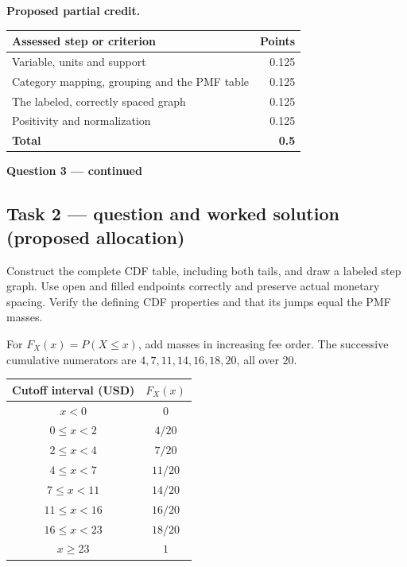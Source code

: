 \par\smallskip
\noindent\begin{minipage}{\linewidth}
\textbf{Proposed partial credit.}\par\smallskip
\begin{tabularx}{\linewidth}{@{}>{\raggedright\arraybackslash}X r@{}}\toprule
\textbf{Assessed step or criterion} & \textbf{Points}\\\midrule
Variable, units and support & 0.125\\
Category mapping, grouping and the PMF table & 0.125\\
The labeled, correctly spaced graph & 0.125\\
Positivity and normalization & 0.125\\
\midrule
\textbf{Total} & \textbf{0.5}\\
\bottomrule\end{tabularx}
\end{minipage}\par\smallskip

\par\vspace{3mm}\secInicio[][sec:q3]

\clearpage
\textbf{Question 3 --- continued}

\subsection*{Task 2 --- question and worked solution (proposed allocation) }
\label{sol:q3t2}

Construct the complete CDF table, including both tails, and draw a labeled step graph. Use open and filled endpoints correctly and preserve actual monetary spacing. Verify the defining CDF properties and that its jumps equal the PMF masses.

For $F_X(x)=P(X\leq x)$, add masses in increasing fee order. The successive cumulative numerators are $4,7,11,14,16,18,20$, all over $20$.

\begin{center}
\begin{tabular}{cc}\toprule
Cutoff interval (USD) & $F_X(x)$\\\midrule
$x<0$ & $0$\\
$0\leq x<2$ & $4/20$\\
$2\leq x<4$ & $7/20$\\
$4\leq x<7$ & $11/20$\\
$7\leq x<11$ & $14/20$\\
$11\leq x<16$ & $16/20$\\
$16\leq x<23$ & $18/20$\\
$x\geq 23$ & $1$\\
\bottomrule\end{tabular}
\end{center}

